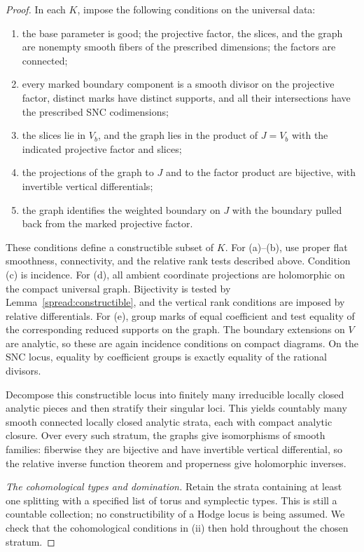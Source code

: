 \begin{proof}
In each \(K\), impose the following conditions on the universal data:
\begin{enumerate}[label=\textup{(\alph*)}]
\item the base parameter is good; the projective factor, the slices,
and the graph are nonempty smooth fibers of the prescribed
dimensions; the factors are connected;
\item every marked boundary component is a smooth divisor on the
projective factor, distinct marks have distinct supports, and all
their intersections have the prescribed SNC codimensions;
\item the slices lie in \(V_b\), and the graph lies in the product
of \(J=V_b\) with the indicated projective factor and slices;
\item the projections of the graph to \(J\) and to the factor
product are bijective, with invertible vertical differentials;
\item the graph identifies the weighted boundary on \(J\) with the
boundary pulled back from the marked projective factor.
\end{enumerate}
These conditions define a constructible subset of \(K\).
For (a)--(b), use proper flat smoothness, connectivity, and the
relative rank tests described above.  Condition (c) is incidence.
For (d), all ambient coordinate projections are holomorphic on
the compact universal graph.  Bijectivity is tested by
Lemma~\ref{spread:constructible}, and the vertical rank conditions
are imposed by relative differentials.  For (e), group marks of
equal coefficient and test equality of the corresponding reduced
supports on the graph.  The boundary extensions on \(V\) are
analytic, so these are again incidence conditions on compact
diagrams.  On the SNC locus, equality by coefficient groups is
exactly equality of the rational divisors.

Decompose this constructible locus into finitely many irreducible
locally closed analytic pieces and then stratify their singular loci.
This yields countably many smooth connected locally closed analytic
strata, each with compact analytic closure.  Over every such stratum,
the graphs give isomorphisms of smooth families: fiberwise they are
bijective and have invertible vertical differential, so the relative
inverse function theorem and properness give holomorphic inverses.

\smallskip
\noindent\emph{The cohomological types and domination.}
Retain the strata containing at least one splitting with a specified
list of torus and symplectic types.  This is still a countable
collection; no constructibility of a Hodge locus is being assumed.
We check that the cohomological conditions in (ii) then hold
throughout the chosen stratum.


\end{proof}
